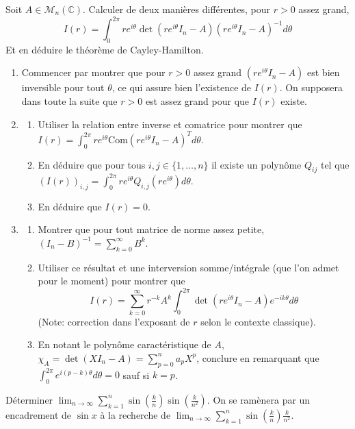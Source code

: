 \begin{exercice}
Soit $A\in \mathcal{M}_{n}(\mathbb{C})$. Calculer de deux manières différentes, pour $r>0$ assez grand,
$$ I(r)=\int_{0}^{2\pi}re^{i\theta} \det(re^{i\theta}I_{n}-A) (re^{i\theta}I_{n}-A)^{-1} d\theta $$
Et en déduire le théorème de Cayley-Hamilton.
\begin{enumerate}
    \item Commencer par montrer que pour $r>0$ assez grand $(re^{i\theta}I_{n}-A)$ est bien inversible pour tout $\theta$, ce qui assure bien l'existence de $I(r)$.
    On supposera dans toute la suite que $r>0$ est assez grand pour que $I(r)$ existe.
    \item 
    \begin{enumerate}
        \item Utiliser la relation entre inverse et comatrice pour montrer que $I(r)=\int_{0}^{2\pi}re^{i\theta} \text{Com}(re^{i\theta}I_n-A)^{T} d\theta$.
        \item En déduire que pour tous $i,j\in\{1,\dots,n\}$ il existe un polynôme $Q_{ij}$ tel que $(I(r))_{i,j}=\int_{0}^{2\pi}re^{i\theta}Q_{i,j}(re^{i\theta}) d\theta$.
        \item En déduire que $I(r)=0$.
    \end{enumerate}
    \item 
    \begin{enumerate}
        \item Montrer que pour tout matrice de norme assez petite, $(I_{n}-B)^{-1}=\sum_{k=0}^{\infty}B^{k}$.
        \item Utiliser ce résultat et une interversion somme/intégrale (que l'on admet pour le moment) pour montrer que
        $$ I(r)=\sum_{k=0}^{\infty}r^{-k}A^{k}\int_{0}^{2\pi}\det(re^{i\theta}I_{n}-A)e^{-ik\theta}d\theta $$
        (Note: correction dans l'exposant de $r$ selon le contexte classique).
        \item En notant le polynôme caractéristique de $A$, $\chi_{A}=\det(XI_{n}-A)=\sum_{p=0}^{n}a_{p}X^{p}$, conclure en remarquant que $\int_{0}^{2\pi}e^{i(p-k)\theta}d\theta=0$ sauf si $k=p$.
    \end{enumerate}
\end{enumerate}
\end{exercice}

\begin{exercice}
Déterminer $\lim_{n\rightarrow\infty}\sum_{k=1}^{n}\sin(\frac{k}{n})\sin(\frac{k}{n^{2}})$.
On se ramènera par un encadrement de $\sin x$ à la recherche de $\lim_{n\rightarrow\infty}\sum_{k=1}^{n}\sin(\frac{k}{n})\frac{k}{n^{2}}$.
\end{exercice}

